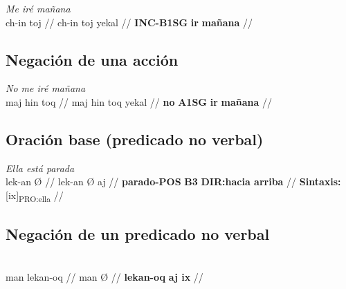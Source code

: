 \documentclass{article}%
\begin{document}
%
\par\medskip%
\ex
\textit{Me iré mañana} \\
\begingl
\gla ch-in toj //
\glb ch-in toj yekal //
\glc \textbf{INC-B1SG} \textbf{ir} \textbf{mañana} //
\endgl
\xe
%
\medskip%
\subsection{Negación de una acción}%
\label{subsec:Negacindeunaaccin}%

%
\par\medskip%
\ex
\textit{No me iré mañana} \\
\begingl
\gla maj hin toq //
\glb maj hin toq yekal //
\glc \textbf{no} \textbf{A1SG} \textbf{ir} \textbf{mañana} //
\endgl
\xe
%
\medskip%
\subsection{Oración base (predicado no verbal)}%
\label{subsec:Oracinbase(predicadonoverbal)}%

%
\par\medskip%
\ex
\textit{Ella está parada} \\
\begingl
\gla lek-an Ø //
\glb lek-an Ø aj //
\glc \textbf{parado-POS} \textbf{B3} \textbf{DIR:hacia arriba} //
\glft \textbf{Sintaxis:} [ix]\textsubscript{PRO:ella} //
\endgl
\xe
%
\medskip%
\subsection{Negación de un predicado no verbal}%
\label{subsec:Negacindeunpredicadonoverbal}%

%
\par\medskip%
\ex
\textit{} \\
\begingl
\gla man lekan-oq //
\glb man Ø //
\glc \textbf{lekan-oq} \textbf{aj ix} //
\endgl
\xe
%
\medskip

%
\end{document}
